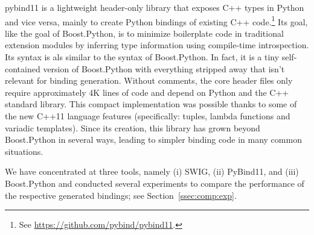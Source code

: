 pybind11 is a lightweight header-only library that exposes C++
types in Python and vice versa, mainly to create Python bindings of
existing C++
code.\footnote{See \url{https://github.com/pybind/pybind11}.} Its
goal, like the goal of Boost.Python, is to minimize boilerplate code
in traditional extension modules by inferring type information using
compile-time introspection. Its syntax is als similar to the syntax of
Boost.Python. In fact, it is a tiny self-contained version of
Boost.Python with everything stripped away that isn't relevant for
binding generation. Without comments, the core header files only
require approximately 4K lines of code and depend on Python and the
C++ standard library. This compact implementation was possible thanks
to some of the new C++11 language features (specifically: tuples,
lambda functions and variadic templates). Since its creation, this
library has grown beyond Boost.Python in several ways, leading to
simpler binding code in many common situations.

We have concentrated at three tools, namely (i) SWIG, (ii) PyBind11,
and (iii) Boost.Python and conducted several experiments to compare
the performance of the respective generated bindings; see
Section~\ref{ssec:comp:exp}.

